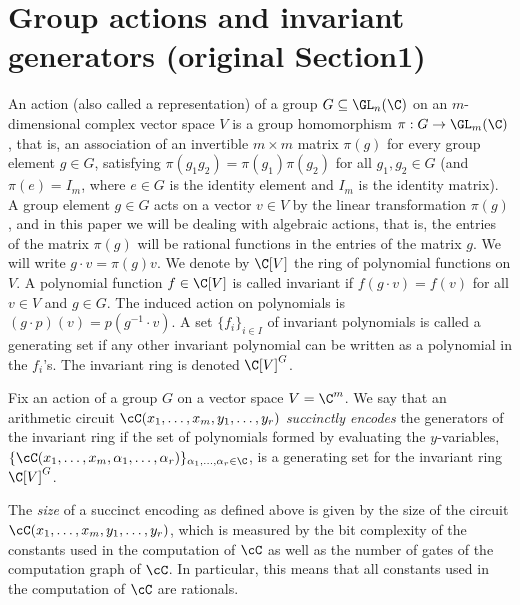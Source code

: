 \section*{Group actions and invariant generators (original Section1)}
An action (also called a representation) of a group $G\subseteq\GL_n(\C)$ on an $m$-dimensional complex vector space $V$ is a group homomorphism $\pi:G\to\GL_m(\C)$, that is, an association of an invertible $m\times m$ matrix $\pi(g)$ for every group element $g\in G$, satisfying $\pi(g_1g_2)=\pi(g_1)\pi(g_2)$ for all $g_1,g_2\in G$ (and $\pi(e)=I_m$, where $e\in G$ is the identity element and $I_m$ is the identity matrix). A group element $g\in G$ acts on a vector $v\in V$ by the linear transformation $\pi(g)$, and in this paper we will be dealing with algebraic actions, that is, the entries of the matrix $\pi(g)$ will be rational functions in the entries of the matrix $g$. We will write $g\cdot v=\pi(g)v$. We denote by $\C[V]$ the ring of polynomial functions on $V$.
A polynomial function $f\in\C[V]$ is called invariant if $f(g\cdot v)=f(v)$ for all $v\in V$ and $g\in G$. The induced action on polynomials is $(g\cdot p)(v)=p(g^{-1}\cdot v)$. A set $\{f_i\}_{i\in I}$ of invariant polynomials is called a generating set if any other invariant polynomial can be written as a polynomial in the $f_i$'s. The invariant ring is denoted $\C[V]^G$.
\setcounter{theorem}{2}
\begin{definition} \label{def:succ.enc}
	Fix an action of a group $G$ on a vector space $V = \C^m$. We say that an arithmetic circuit
	$\cC(x_1,\ldots, x_m,y_1,\ldots, y_r)$ \emph{succinctly encodes} the generators of the invariant
	ring if the set of polynomials formed by evaluating the $y$-variables,
	$\{\cC(x_1,\ldots, x_m, \alpha_1,\ldots, \alpha_r)\}_{\alpha_1,\ldots, \alpha_r \in \C}$,
  is a generating set for the invariant ring~$\C[V]^G$.
\end{definition}

\begin{remark}
	The \emph{size} of a succinct encoding as defined above is given by the size of the circuit
	$\cC(x_1, \ldots, x_m, y_1, \ldots, y_r)$, which is measured by the bit complexity of the
	constants used in the computation of $\cC$ as well as the number of gates of the computation
	graph of $\cC$.
  In particular, this means that all constants used in the computation of $\cC$ are rationals.
\end{remark}
